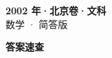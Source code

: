 \documentclass[zihao=-4, a4paper]{ctexart}
\begin{document}
\begin{center}
  {\Large\bfseries 2002 年·北京卷·文科}\\[4pt]
  {\large 数学 · 简答版}
\end{center}
\medskip
{}

\clearpage
{}
\begin{center}{\Large\bfseries 答案速查}\end{center}
\medskip

\end{document}

